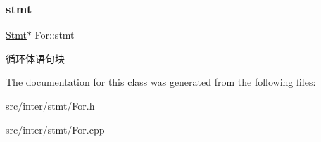 \subsubsection{\texorpdfstring{stmt}{stmt}}
{\footnotesize\ttfamily \hyperlink{class_stmt}{Stmt}$\ast$ For\+::stmt}

循环体语句块 

The documentation for this class was generated from the following files\+:\begin{DoxyCompactItemize}
\item 
src/inter/stmt/For.\+h\item 
src/inter/stmt/For.\+cpp\end{DoxyCompactItemize}
